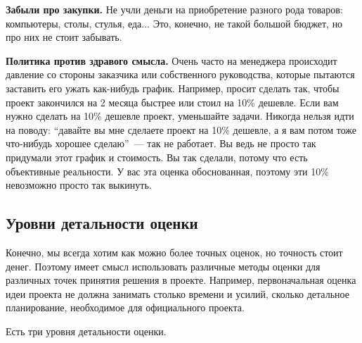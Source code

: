 \documentclass{../../text-style}
\begin{document}
\textbf{Забыли про закупки.} Не учли деньги на приобретение разного рода товаров: компьютеры, столы, стулья, еда... Это, конечно, не такой большой бюджет, но про них не стоит забывать.

\textbf{Политика против здравого смысла.} Очень часто на менеджера происходит давление со стороны заказчика или собственного руководства, которые пытаются заставить его ужать как-нибудь график. Например, просит сделать так, чтобы проект закончился на 2 месяца быстрее или стоил на 10\% дешевле. Если вам нужно сделать на 10\% дешевле проект, уменьшайте задачи. Никогда нельзя идти на поводу: \enquote{давайте вы мне сделаете проект на 10\% дешевле, а я вам потом тоже что-нибудь хорошее сделаю}~--- так не работает. Вы ведь не просто так придумали этот график и стоимость. Вы так сделали, потому что есть объективные реальности. У вас эта оценка обоснованная, поэтому эти 10\% невозможно просто так выкинуть.

\subsection{Уровни детальности оценки}

Конечно, мы всегда хотим как можно более точных оценок, но точность стоит денег. Поэтому имеет смысл использовать различные методы оценки для различных точек принятия решения в проекте. Например, первоначальная оценка идеи проекта не должна занимать столько времени и усилий, сколько детальное планирование, необходимое для официального проекта.

Есть три уровня детальности оценки.
\end{document}
